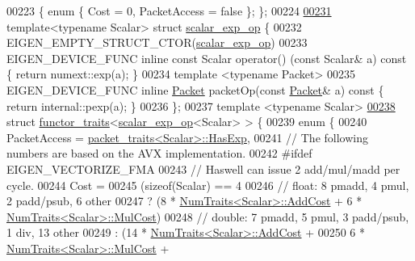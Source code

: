 \begin{DoxyCode}
00223 \{ \textcolor{keyword}{enum} \{ Cost = 0, PacketAccess = \textcolor{keyword}{false} \}; \};
00224 
\hyperlink{struct_eigen_1_1internal_1_1scalar__exp__op}{00231} \textcolor{keyword}{template}<\textcolor{keyword}{typename} Scalar> \textcolor{keyword}{struct }\hyperlink{struct_eigen_1_1internal_1_1scalar__exp__op}{scalar\_exp\_op} \{
00232   EIGEN\_EMPTY\_STRUCT\_CTOR(\hyperlink{struct_eigen_1_1internal_1_1scalar__exp__op}{scalar\_exp\_op})
00233   EIGEN\_DEVICE\_FUNC \textcolor{keyword}{inline} \textcolor{keyword}{const} Scalar operator() (\textcolor{keyword}{const} Scalar& a)\textcolor{keyword}{ const }\{ \textcolor{keywordflow}{return} numext::exp(a); \}
00234   \textcolor{keyword}{template} <\textcolor{keyword}{typename} Packet>
00235   EIGEN\_DEVICE\_FUNC \textcolor{keyword}{inline} \hyperlink{union_eigen_1_1internal_1_1_packet}{Packet} packetOp(\textcolor{keyword}{const} \hyperlink{union_eigen_1_1internal_1_1_packet}{Packet}& a)\textcolor{keyword}{ const }\{ \textcolor{keywordflow}{return} internal::pexp(a); \}
00236 \};
00237 \textcolor{keyword}{template} <\textcolor{keyword}{typename} Scalar>
\hyperlink{struct_eigen_1_1internal_1_1functor__traits_3_01scalar__exp__op_3_01_scalar_01_4_01_4}{00238} \textcolor{keyword}{struct }\hyperlink{struct_eigen_1_1internal_1_1functor__traits}{functor\_traits}<\hyperlink{struct_eigen_1_1internal_1_1scalar__exp__op}{scalar\_exp\_op}<Scalar> > \{
00239   \textcolor{keyword}{enum} \{
00240     PacketAccess = \hyperlink{struct_eigen_1_1internal_1_1packet__traits}{packet\_traits<Scalar>::HasExp},
00241     \textcolor{comment}{// The following numbers are based on the AVX implementation.}
00242 \textcolor{preprocessor}{#ifdef EIGEN\_VECTORIZE\_FMA}
00243     \textcolor{comment}{// Haswell can issue 2 add/mul/madd per cycle.}
00244     Cost =
00245     (\textcolor{keyword}{sizeof}(Scalar) == 4
00246      \textcolor{comment}{// float: 8 pmadd, 4 pmul, 2 padd/psub, 6 other}
00247      ? (8 * \hyperlink{group___core___module_struct_eigen_1_1_num_traits}{NumTraits<Scalar>::AddCost} + 6 * 
      \hyperlink{group___core___module_struct_eigen_1_1_num_traits}{NumTraits<Scalar>::MulCost})
00248      \textcolor{comment}{// double: 7 pmadd, 5 pmul, 3 padd/psub, 1 div,  13 other}
00249      : (14 * \hyperlink{group___core___module_struct_eigen_1_1_num_traits}{NumTraits<Scalar>::AddCost} +
00250         6 * \hyperlink{group___core___module_struct_eigen_1_1_num_traits}{NumTraits<Scalar>::MulCost} +

\end{DoxyCode}
